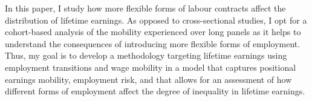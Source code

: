 \documentclass[12pt, a4paper]{article}
\begin{document}




In this paper, I study how more flexible forms of labour contracts affect the distribution of lifetime earnings. As opposed to cross-sectional studies, I opt for a cohort-based analysis of the mobility experienced over long panels as it helps to understand the consequences of introducing more flexible forms of employment. Thus, my goal is to develop a methodology targeting lifetime earnings using employment transitions and wage mobility in a model that captures positional earnings mobility, employment risk, and that allows for an assessment of how different forms of employment affect the degree of inequality in lifetime earnings.
\end{document}

